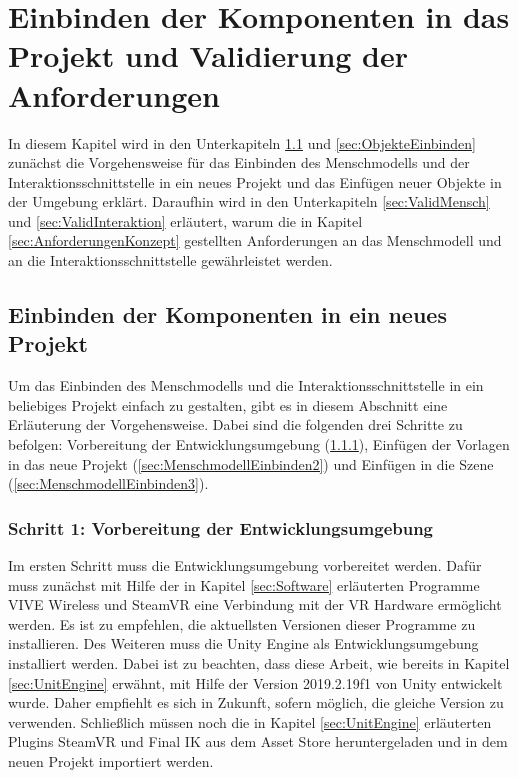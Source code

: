 \chapter{Einbinden der Komponenten in das Projekt und Validierung der Anforderungen}\label{cha:ValidierungDesKonzepts}
In diesem Kapitel wird in den Unterkapiteln \ref{sec:MenschmodellEinbinden} und \ref{sec:ObjekteEinbinden} zunächst die Vorgehensweise für das Einbinden des Menschmodells und der Interaktionsschnittstelle in ein neues Projekt und das Einfügen neuer Objekte in der Umgebung erklärt. Daraufhin wird in den Unterkapiteln \ref{sec:ValidMensch} und \ref{sec:ValidInteraktion} erläutert, warum die in Kapitel \ref{sec:AnforderungenKonzept} gestellten Anforderungen an das Menschmodell und an die Interaktionsschnittstelle gewährleistet werden.

\section{Einbinden der Komponenten in ein neues Projekt}\label{sec:MenschmodellEinbinden}
Um das Einbinden des Menschmodells und die Interaktionsschnittstelle in ein beliebiges Projekt einfach zu gestalten, gibt es in diesem Abschnitt eine Erläuterung der Vorgehensweise. Dabei sind die folgenden drei Schritte zu befolgen: Vorbereitung der Entwicklungsumgebung (\ref{sec:MenschmodellEinbinden1}), Einfügen der Vorlagen in das neue Projekt (\ref{sec:MenschmodellEinbinden2}) und Einfügen in die Szene (\ref{sec:MenschmodellEinbinden3}).

\subsection{Schritt 1: Vorbereitung der Entwicklungsumgebung}\label{sec:MenschmodellEinbinden1}
Im ersten Schritt muss die Entwicklungsumgebung vorbereitet werden. Dafür muss zunächst mit Hilfe der in Kapitel \ref{sec:Software} erläuterten Programme VIVE Wireless und SteamVR eine Verbindung mit der VR Hardware ermöglicht werden. Es ist zu empfehlen, die aktuellsten Versionen dieser Programme zu installieren. Des Weiteren muss die Unity Engine als Entwicklungsumgebung installiert werden. Dabei ist zu beachten, dass diese Arbeit, wie bereits in Kapitel \ref{sec:UnitEngine} erwähnt, mit Hilfe der Version 2019.2.19f1 von Unity entwickelt wurde. Daher empfiehlt es sich in Zukunft, sofern möglich, die gleiche Version zu verwenden. Schließlich müssen noch die in Kapitel \ref{sec:UnitEngine} erläuterten Plugins SteamVR und Final IK aus dem Asset Store heruntergeladen und in dem neuen Projekt importiert werden.

